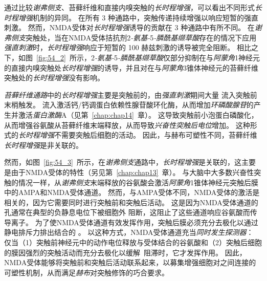 通过比较\textit{谢弗侧支}、苔藓纤维和直接内嗅突触的\textit{长时程增强}，可以看出不同形式\textit{长时程增强}机制的异同。
在所有 3 种通路中，突触传递持续增强以响应短暂的强直刺激。
然而，NMDA受体对\textit{长时程增强}诱导的贡献在 3 种通路中有所不同。
在\textit{谢弗侧支}突触处，当在NMDA受体拮抗剂2\textit{-氨基-}5\textit{-膦酰基缬草酸}存在的情况下应用\textit{强直刺激}时，\textit{长时程增强}响应于短暂的 100 赫兹刺激的诱导被完全阻断。
相比之下，如图~\ref{fig:54_2}~所示，2\textit{-氨基-}5\textit{-膦酰基缬草酸}仅部分抑制在与\textit{阿蒙角}1神经元的直接内嗅突触处\textit{长时程增强}的诱导，并且对在与\textit{阿蒙角}3锥体神经元的苔藓纤维突触处的\textit{长时程增强}没有影响。


\textit{苔藓纤维通路}中的\textit{长时程增强}主要是突触前的，由\textit{强直刺激}期间大量  流入突触前末梢触发。
 流入激活钙/钙调蛋白依赖性腺苷酸环化酶，从而增加\textit{环磷酸腺苷}的产生并激活\textit{蛋白激酶}A（见第~\ref{chap:chap14}~章）。
这导致突触前小泡蛋白磷酸化，从而增强谷氨酸从苔藓纤维末端释放，从而导致\textit{兴奋性突触后电位}增加。
这种形式的\textit{长时程增强}不需要突触后细胞的活动。
因此，与赫布可塑性不同，苔藓纤维\textit{长时程增强}是非关联的。


然而，如图~\ref{fig:54_3}~所示，在\textit{谢弗侧支}通路中，\textit{长时程增强}是关联的，这主要是由于NMDA受体的特性（另见第~\ref{chap:chap13}~章）。
与大脑中大多数兴奋性突触的情况一样，从\textit{谢弗侧支}末端释放的谷氨酸会激活\textit{阿蒙角}1锥体神经元突触后膜中的AMPA和NMDA受体通道。
然而，与AMPA受体不同，NMDA受体的激活是相关的，因为它需要同时进行突触前和突触后活动。
这是因为NMDA受体通道的孔通常在典型的负静息电位下被细胞外  阻断，这阻止了这些通道响应谷氨酸而传导离子。
为了使NMDA受体通道有效发挥作用，突触后膜必须充分去极化以通过静电排斥力排出结合的 。
以这种方式，NMDA受体通道充当\textit{同时发生探测器}：
仅当（1）突触前神经元中的动作电位释放与受体结合的谷氨酸和（2）突触后细胞的膜因强烈的突触活动而充分去极化以缓解~阻滞时，它才发挥作用。
因此，NMDA受体能够将突触前和突触后活动联系起来，以募集增强细胞对之间连接的可塑性机制，从而满足\textit{赫布}对突触修饰的巧合要求。


